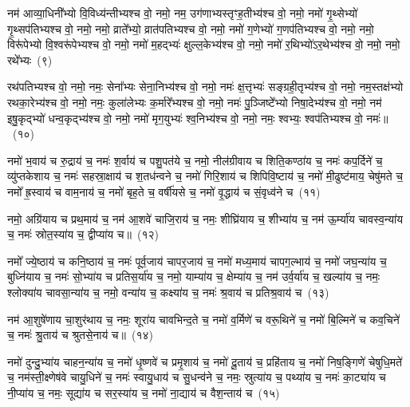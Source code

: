{\anuvakamend[{कु॒लु॒ञ्चाना॒म्पत॑ये॒ नमो॒ नमो\-ऽश्व॑पतिभ्य॒स्त्रीणि॑ च}]}%

नम॑ आव्या॒धिनी᳚भ्यो वि॒विध्य॑न्तीभ्यश्च वो॒ नमो॒ नम॒ उग॑णाभ्यस्तृꣳह॒तीभ्य॑श्च वो॒ नमो॒ नमो॑ गृ॒थ्सेभ्यो॑ गृ॒थ्सप॑तिभ्यश्च वो॒ नमो॒ नमो॒ व्राते᳚भ्यो॒ व्रात॑पतिभ्यश्च वो॒ नमो॒ नमो॑ ग॒णेभ्यो॑ ग॒णप॑तिभ्यश्च वो॒ नमो॒ नमो॒ विरू॑पेभ्यो वि॒श्वरू॑पेभ्यश्च वो॒ नमो॒ नमो॑ म॒हद्भ्यः॑ क्षुल्ल॒केभ्य॑श्च वो॒ नमो॒ नमो॑ र॒थिभ्यो॑\-ऽर॒थेभ्य॑श्च वो॒ नमो॒ नमो॒ रथे᳚भ्यः~(९)

रथ॑पतिभ्यश्च वो॒ नमो॒ नमः॒ सेना᳚भ्यः सेना॒निभ्य॑श्च वो॒ नमो॒ नमः॑ क्ष॒त्तृभ्यः॑ सङ्ग्रही॒तृभ्य॑श्च वो॒ नमो॒ नम॒स्तक्ष॑भ्यो रथका॒रेभ्य॑श्च वो॒ नमो॒ नमः॒ कुला॑लेभ्यः क॒र्मारे᳚भ्यश्च वो॒ नमो॒ नमः॑ पु॒ञ्जिष्टे᳚भ्यो निषा॒देभ्य॑श्च वो॒ नमो॒ नम॑ इषु॒कृद्भ्यो॑ धन्व॒कृद्भ्य॑श्च वो॒ नमो॒ नमो॑ मृग॒युभ्यः॑ श्व॒निभ्य॑श्च वो॒ नमो॒ नमः॒ श्वभ्यः॒ श्वप॑तिभ्यश्च वो॒ नमः॑॥~(१०)

{\anuvakamend[{रथे᳚भ्यः॒ श्वप॑तिभ्यश्च॒ द्वे च॑}]}%

नमो॑ भ॒वाय॑ च रु॒द्राय॑ च॒ नमः॑ श॒र्वाय॑ च पशु॒पत॑ये च॒ नमो॒ नील॑ग्रीवाय च शिति॒कण्ठा॑य च॒ नमः॑ कप॒र्दिने॑ च॒ व्यु॑प्तकेशाय च॒ नमः॑ सहस्रा॒क्षाय॑ च श॒तध॑न्वने च॒ नमो॑ गिरि॒शाय॑ च शिपिवि॒ष्टाय॑ च॒ नमो॑ मी॒ढुष्ट॑माय॒ चेषु॑मते च॒ नमो᳚ ह्र॒स्वाय॑ च वाम॒नाय॑ च॒ नमो॑ बृह॒ते च॒ वर्\mbox{}षी॑यसे च॒ नमो॑ वृ॒द्धाय॑ च सं॒वृध्व॑ने च~(११)

नमो॒ अग्रि॑याय च प्रथ॒माय॑ च॒ नम॑ आ॒शवे॑ चाजि॒राय॑ च॒ नमः॒ शीघ्रि॑याय च॒ शीभ्या॑य च॒ नम॑ ऊ॒र्म्या॑य चावस्व॒न्या॑य च॒ नमः॑ स्रोत॒स्या॑य च॒ द्वीप्या॑य च॥~(१२)

{\anuvakamend[{सं॒ वृध्व॑ने च॒ पञ्च॑विꣳशतिश्च}]}%

नमो᳚ ज्ये॒ष्ठाय॑ च कनि॒ष्ठाय॑ च॒ नमः॑ पूर्व॒जाय॑ चापर॒जाय॑ च॒ नमो॑ मध्य॒माय॑ चापग॒ल्भाय॑ च॒ नमो॑ जघ॒न्या॑य च॒ बुध्नि॑याय च॒ नमः॑ सो॒भ्या॑य च प्रतिस॒र्या॑य च॒ नमो॒ याम्या॑य च॒ क्षेम्या॑य च॒ नम॑ उर्व॒र्या॑य च॒ खल्या॑य च॒ नमः॒ श्लोक्या॑य चावसा॒न्या॑य च॒ नमो॒ वन्या॑य च॒ कक्ष्या॑य च॒ नमः॑ श्र॒वाय॑ च प्रतिश्र॒वाय॑ च~(१३)

नम॑ आ॒शुषे॑णाय चा॒शुर॑थाय च॒ नमः॒ शूरा॑य चावभिन्द॒ते च॒ नमो॑ व॒र्मिणे॑ च वरू॒थिने॑ च॒ नमो॑ बि॒ल्मिने॑ च कव॒चिने॑ च॒ नमः॑ श्रु॒ताय॑ च श्रुतसे॒नाय॑ च॥~(१४)

{\anuvakamend[{प्र॒ति॒श्र॒वाय॑ च॒ पञ्च॑विꣳशतिश्च}]}%

नमो॑ दुन्दु॒भ्या॑य चाहन॒न्या॑य च॒ नमो॑ धृ॒ष्णवे॑ च प्रमृ॒शाय॑ च॒ नमो॑ दू॒ताय॑ च॒ प्रहि॑ताय च॒ नमो॑ निष॒ङ्गिणे॑ चेषुधि॒मते॑ च॒ नम॑स्ती॒क्ष्णेष॑वे चायु॒धिने॑ च॒ नमः॑ स्वायु॒धाय॑ च सु॒धन्व॑ने च॒ नमः॒ स्रुत्या॑य च॒ पथ्या॑य च॒ नमः॑ का॒ट्या॑य च नी॒प्या॑य च॒ नमः॒ सूद्या॑य च सर॒स्या॑य च॒ नमो॑ ना॒द्याय॑ च वैश॒न्ताय॑ च~(१५)

